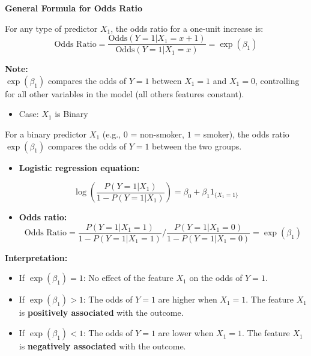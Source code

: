 \documentclass{article}
\providecommand{\tightlist}{%
  \setlength{\itemsep}{0pt}\setlength{\parskip}{0pt}}
\begin{document}
\textbf{General Formula for Odds Ratio}

For any type of predictor \(X_1\), the odds ratio for a one-unit
increase is:\\
\[\text{Odds Ratio} = \frac{\text{Odds}(Y=1 | X_1 = x+1)}{\text{Odds}(Y=1 | X_1 = x)} = \exp(\beta_1)\]

\textbf{Note:}\\
\(\exp(\beta_1)\) compares the odds of \(Y=1\) between \(X_1=1\) and
\(X_1=0\), controlling for all other variables in the model (all others
features constant).

\begin{itemize}
\tightlist
\item
  Case: \(X_1\) is Binary
\end{itemize}

For a binary predictor \(X_1\)\hspace{0pt} (e.g., \(0\) = non-smoker,
\(1\) = smoker), the odds ratio \(\exp(\beta_1)\)\hspace{0pt} compares
the odds of \(Y=1\) between the two groups.

\begin{itemize}
\tightlist
\item
  \textbf{Logistic regression equation:}
\end{itemize}

\[\log\left(\dfrac{P(Y=1 | X_1)}{1 - P(Y=1 | X_1)}\right) = \beta_0 + \beta_1 1_{\{X_1 = 1\}}\]

\begin{itemize}
\tightlist
\item
  \textbf{Odds ratio:}
  \[\text{Odds Ratio} = \dfrac{P(Y=1 | X_1=1)}{1 - P(Y=1 | X_1=1)} / \dfrac{P(Y=1 | X_1=0)}{1 - P(Y=1 | X_1=0)} = \exp(\beta_1)\]
\end{itemize}

\textbf{Interpretation:}

\begin{itemize}
\tightlist
\item
  If \(\exp(\beta_1) = 1\): No effect of the feature \(X_1\)\hspace{0pt}
  on the odds of \(Y=1\).
\item
  If \(\exp(\beta_1)>1\): The odds of \(Y=1\) are higher when \(X_1=1\).
  The feature \(X_1\)\hspace{0pt} is \textbf{positively associated} with
  the outcome.
\item
  If \(\exp(\beta_1) < 1\): The odds of \(Y=1\) are lower when
  \(X_1=1\). The feature \(X_1\)\hspace{0pt} is \textbf{negatively associated} with the outcome.
\end{itemize}
\end{document}
